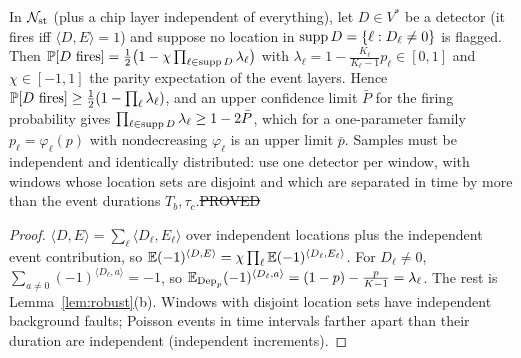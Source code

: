 \begin{lemma}\label{lem:st-robust}
In $\mathcal{N}_{\rm st}$ (plus a chip layer independent of everything), let $D\in V^\ast$ be a detector (it fires iff $\langle D,E\rangle=1$) and suppose no location in $\operatorname{supp} D=\{\ell:D_\ell\ne0\}$ is flagged. Then $\mathbb{P}[\text{$D$ fires}]=\tfrac12\big(1-\chi\prod_{\ell\in\operatorname{supp} D}\lambda_\ell\big)$ with $\lambda_\ell=1-\tfrac{K_\ell}{K_\ell-1}p_\ell\in[0,1]$ and $\chi\in[-1,1]$ the parity expectation of the event layers. Hence $\mathbb{P}[\text{$D$ fires}]\ge\tfrac12(1-\prod_\ell\lambda_\ell)$, and an upper confidence limit $\bar P$ for the firing probability gives $\prod_{\ell\in\operatorname{supp} D}\lambda_\ell\ge1-2\bar P$, which for a one-parameter family $p_\ell=\varphi_\ell(p)$ with nondecreasing $\varphi_\ell$ is an upper limit $\bar p$. Samples must be independent and identically distributed: use one detector per window, with windows whose location sets are disjoint and which are separated in time by more than the event durations $T_b,\tau_c$.\hfill\st{PROVED}
\end{lemma}
\begin{proof}
$\langle D,E\rangle=\sum_\ell\langle D_\ell,E_{\ell}\rangle$ over independent locations plus the independent event contribution, so $\mathbb{E}(-1)^{\langle D,E\rangle}=\chi\prod_\ell\mathbb{E}(-1)^{\langle D_\ell,E_\ell\rangle}$. For $D_\ell\ne0$, $\sum_{a\ne0}(-1)^{\langle D_\ell,a\rangle}=-1$, so $\mathbb{E}_{\mathrm{Dep}_{p}}(-1)^{\langle D_\ell,a\rangle}=(1-p)-\tfrac p{K-1}=\lambda_\ell$. The rest is Lemma~\ref{lem:robust}(b). Windows with disjoint location sets have independent background faults; Poisson events in time intervals farther apart than their duration are independent (independent increments).
\end{proof}

